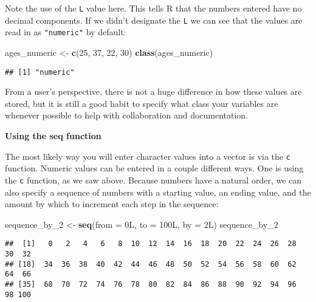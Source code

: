 \documentclass[]{tufte-book}
\newenvironment{Shaded}{\begin{snugshade}}{\end{snugshade}}
\newcommand{\DataTypeTok}[1]{\textcolor[rgb]{0.13,0.29,0.53}{#1}}
\newcommand{\DecValTok}[1]{\textcolor[rgb]{0.00,0.00,0.81}{#1}}
\newcommand{\KeywordTok}[1]{\textcolor[rgb]{0.13,0.29,0.53}{\textbf{#1}}}
\newcommand{\NormalTok}[1]{#1}
\newcommand{\StringTok}[1]{\textcolor[rgb]{0.31,0.60,0.02}{#1}}
\begin{document}
Note the use of the \texttt{L} value here. This tells R that the numbers entered have no decimal components. If we didn't designate the \texttt{L} we can see that the values are read in as \texttt{"numeric"} by default:

\begin{Shaded}
\begin{Highlighting}[]
\NormalTok{ages_numeric <-}\StringTok{ }\KeywordTok{c}\NormalTok{(}\DecValTok{25}\NormalTok{, }\DecValTok{37}\NormalTok{, }\DecValTok{22}\NormalTok{, }\DecValTok{30}\NormalTok{)}
\KeywordTok{class}\NormalTok{(ages_numeric)}
\end{Highlighting}
\end{Shaded}

\begin{verbatim}
## [1] "numeric"
\end{verbatim}

From a user's perspective, there is not a huge difference in how these values are stored, but it is still a good habit to specify what class your variables are whenever possible to help with collaboration and documentation. \newline

\vspace*{0.2in}

\noindent\textbf{Using the seq function}\vspace*{0.1in}

The most likely way you will enter character values into a vector is via the \texttt{c} function. Numeric values can be entered in a couple different ways. One is using the \texttt{c} function, as we saw above. Because numbers have a natural order, we can also specify a sequence of numbers with a starting value, an ending value, and the amount by which to increment each step in the sequence:

\begin{Shaded}
\begin{Highlighting}[]
\NormalTok{sequence_by_}\DecValTok{2}\NormalTok{ <-}\StringTok{ }\KeywordTok{seq}\NormalTok{(}\DataTypeTok{from =}\NormalTok{ 0L, }\DataTypeTok{to =}\NormalTok{ 100L, }\DataTypeTok{by =}\NormalTok{ 2L)}
\NormalTok{sequence_by_}\DecValTok{2}
\end{Highlighting}
\end{Shaded}

\begin{verbatim}
##  [1]   0   2   4   6   8  10  12  14  16  18  20  22  24  26  28  30  32
## [18]  34  36  38  40  42  44  46  48  50  52  54  56  58  60  62  64  66
## [35]  68  70  72  74  76  78  80  82  84  86  88  90  92  94  96  98 100
\end{verbatim}
\end{document}
